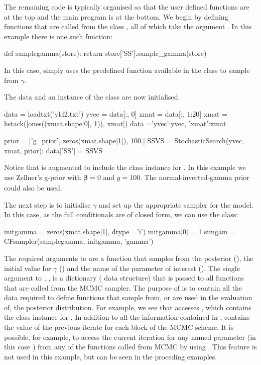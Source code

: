 \documentclass[article]{jss}
\begin{document}
The remaining code is typically organised so that the user defined
functions are at the top and the main program is at the bottom.  We
begin by defining functions that are called from the class
, all of which take the argument . In this
example there is one such function:

\begin{Code}
def samplegamma(store):
    return store['SS'].sample_gamma(store)
\end{Code}
In this case,  simply uses the predefined function
available in the  class to sample from
$\gamma$. 

The data and an instance of the class  are now
initialised:
\begin{Code}
data = loadtxt('yld2.txt')
yvec = data[:, 0]
xmat = data[:, 1:20]
xmat = hstack([ones((xmat.shape[0], 1)), xmat])
data ={'yvec':yvec, 'xmat':xmat}

prior = ['g_prior', zeros(xmat.shape[1]), 100.]
SSVS = StochasticSearch(yvec, xmat, prior);
data['SS'] = SSVS
\end{Code}


Notice that  is augmented to include the class instance for
.  In this example we use Zellner's g-prior with
$\bm{\underline{\beta}} = 0$ and $g=100$. The normal-inverted-gamma
prior could also be used.

The next step is to initialise $\gamma$ and set up the appropriate
sampler for the model. In this case, as the full conditionals are
of closed form, we can use the  class:

\begin{Code}
initgamma = zeros(xmat.shape[1], dtype ='i')
initgamma[0] = 1
simgam = CFsampler(samplegamma, initgamma, 'gamma')
\end{Code}

The required arguments to  are a function that samples
from the posterior \newline (), the initial value
for $\gamma$ () and the name of the parameter of
interest (). The single argument to ,
, is a dictionary ( data structure) that
is passed to all functions that are called from the MCMC sampler.  The
purpose of  is to contain all the data required to define
functions that sample from, or are used in the evaluation of, the
posterior distribution. For example, we see that 
accesses , which contains the class instance for
. In addition to all the information contained
in ,  contains the value of the previous
iterate for each block of the MCMC scheme. It is possible, for
example, to access the current iteration for any named parameter (in
this case ) from any of the functions called from MCMC
by using . This feature is not used in this
example, but can be seen in the proceding examples.
\end{document}
